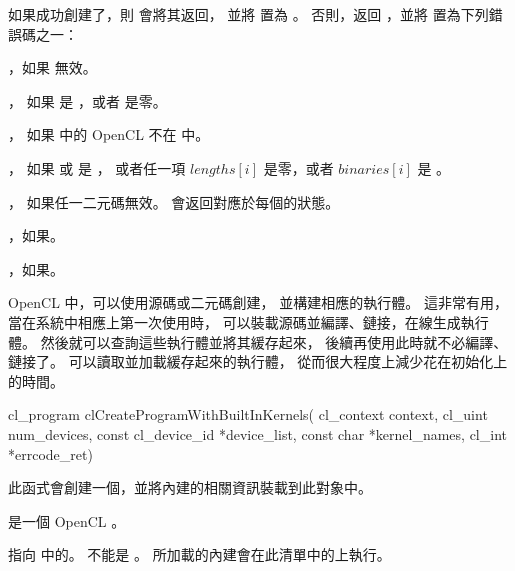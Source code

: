 如果成功創建了，則  會將其返回，
並將  置為 。
否則，返回 ，並將  置為下列錯誤碼之一：
\startigBase
\item {}，如果  無效。

\item {}，
如果  是 ，或者  是零。

\item {}，
如果  中的 OpenCL 不在  中。

\item {}，
如果  或  是 ，
或者任一項 $lengths[i]$ 是零，或者 $binaries[i]$ 是 。

\item {}，
如果任一二元碼無效。
 會返回對應於每個的狀態。

\item {}，如果\scdevfailres。

\item {}，如果\schostfailres。
\stopigBase

OpenCL 中，可以使用源碼或二元碼創建，
並構建相應的執行體。
這非常有用，當在系統中相應上第一次使用時，
可以裝載源碼並編譯、鏈接，在線生成執行體。
然後就可以查詢這些執行體並將其緩存起來，
後續再使用此時就不必編譯、鏈接了。
可以讀取並加載緩存起來的執行體，
從而很大程度上減少花在初始化上的時間。


\startCLFUNC
cl_program clCreateProgramWithBuiltInKernels(
			cl_context context,
			cl_uint num_devices,
			const cl_device_id *device_list,
			const char *kernel_names,
			cl_int *errcode_ret)
\stopCLFUNC

此函式會創建一個，並將內建的相關資訊裝載到此對象中。

 是一個 OpenCL 。

 指向  中的。
 不能是 。
所加載的內建會在此清單中的上執行。

